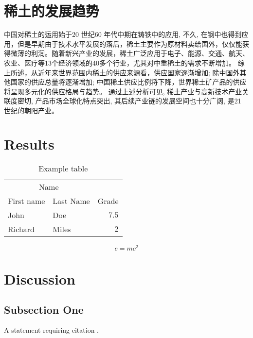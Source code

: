 \documentclass[twoside,twocolumn]{article}
\begin{document}
\section{稀土的发展趋势}
中国对稀土的运用始于20 世纪60 年代中期在铸铁中的应用, 不久, 在钢中也得到应用，但是早期由于技术水平发展的落后，稀土主要作为原材料卖给国外，仅仅能获得微薄的利润。随着新兴产业的发展，稀土广泛应用于电子、能源、交通、航天、农业、医疗等13个经济领域的40多个行业，尤其对中重稀土的需求不断增加。
综上所述，从近年来世界范围内稀土的供应来源看，供应国家逐渐增加; 除中国外其他国家的供应总量将逐渐增加; 中国稀土供应比例将下降，世界稀土矿产品的供应将呈现多元化的供应格局与趋势。
通过上述分析可见, 稀土产业与高新技术产业关联度密切, 产品市场全球化特点突出, 其后续产业链的发展空间也十分广阔, 是21 世纪的朝阳产业。



\section{Results}

\begin{table}
\caption{Example table}
\centering
\begin{tabular}{llr}
\toprule
\multicolumn{2}{c}{Name} \\
\cmidrule(r){1-2}
First name & Last Name & Grade \\
\midrule
John & Doe & $7.5$ \\
Richard & Miles & $2$ \\
\bottomrule
\end{tabular}
\end{table}

\blindtext %

\begin{equation}
\label{eq:emc}
e = mc^2
\end{equation}

\blindtext %


\section{Discussion}

\subsection{Subsection One}

A statement requiring citation \cite{Figueredo:2009dg}.
\blindtext %
\end{document}
